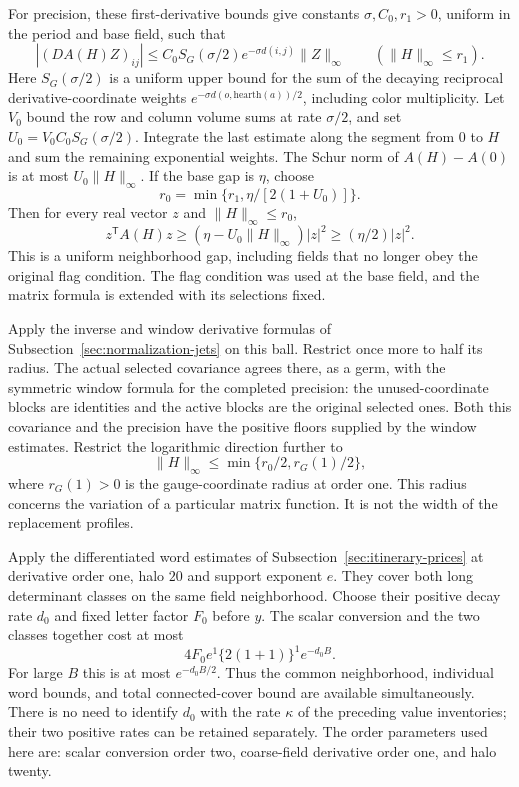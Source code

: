 For precision, these first-derivative bounds give constants
$\sigma,C_0,r_1>0$, uniform in the period and base field, such that
\[
 |(DA(H)Z)_{ij}|\leq C_0S_G(\sigma/2)
                  e^{-\sigma d(i,j)}\|Z\|_\infty
       \qquad(\|H\|_\infty\leq r_1).
\]
Here $S_G(\sigma/2)$ is a uniform upper bound for the sum of the
decaying reciprocal derivative-coordinate weights
$e^{-\sigma d(o,\mathrm{hearth}(a))/2}$, including color multiplicity. Let $V_0$ bound the row and column
volume sums at rate $\sigma/2$, and set
$U_0=V_0C_0S_G(\sigma/2)$. Integrate the last estimate along the segment
from $0$ to $H$ and sum the remaining exponential weights. The Schur
norm of $A(H)-A(0)$ is at most $U_0\|H\|_\infty$.
If the base gap is $\eta$, choose
\[
 r_0=\min\{r_1,\eta/[2(1+U_0)]\}.
\]
Then for every real vector $z$ and $\|H\|_\infty\leq r_0$,
\[
 z^{\mathsf T}A(H)z
 \geq(\eta-U_0\|H\|_\infty)|z|^2
 \geq(\eta/2)|z|^2.
\]
This is a uniform neighborhood gap, including fields that no longer obey
the original flag condition. The flag condition was used at the base
field, and the matrix formula is extended with its selections fixed.

Apply the inverse and window derivative formulas of
Subsection~\ref{sec:normalization-jets} on this ball. Restrict once more to
half its radius. The actual selected covariance agrees there, as a germ,
with the symmetric window formula for the completed precision: the
unused-coordinate blocks are identities and the active blocks are the
original selected ones. Both this covariance and the precision have the
positive floors supplied by the window estimates. Restrict the logarithmic
direction further to
\[
 \|H\|_\infty\leq\min\{r_0/2,r_G(1)/2\},
\]
where $r_G(1)>0$ is the gauge-coordinate radius at order one. This radius
concerns the variation of a particular matrix function. It is not the
width of the replacement profiles.

Apply the differentiated word estimates of
Subsection~\ref{sec:itinerary-prices} at derivative order one, halo $20$ and
support exponent $e$. They cover both long determinant classes on the
same field neighborhood. Choose their positive decay rate $d_0$ and
fixed letter factor $F_0$ before $y$. The scalar conversion and the two
classes together cost at most
\[
 4F_0 e^1\{2(1+1)\}^{1}e^{-d_0B}.
\]
For large $B$ this is at most $e^{-d_0B/2}$. Thus the common neighborhood,
individual word bounds, and total connected-cover bound are available
simultaneously. There is no need to identify $d_0$ with the rate
$\kappa$ of the preceding value inventories; their two positive rates
can be retained separately. The order parameters used here are: scalar
conversion order two, coarse-field derivative order one, and halo twenty.

